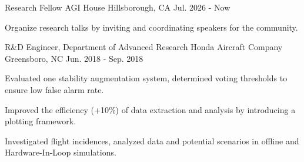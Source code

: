 

\begin{cventries}




  \cventry
    {Research Fellow} %
    {AGI House} %
    {Hillsborough, CA} %
    {Jul. 2026 - Now} %
    {
    \begin{cvitems}
    \item {Organize research talks by inviting and coordinating speakers for the community.}
       \end{cvitems}
    }

  \cventry
    {R\&D Engineer, Department of Advanced Research} %
    {Honda Aircraft Company} %
    {Greensboro, NC} %
    {Jun. 2018 - Sep. 2018} %
    {
      \begin{cvitems} %
        \item {Evaluated one stability augmentation system, determined voting thresholds to ensure low false alarm rate.}
        \item {Improved the efficiency (+10\%) of data extraction and analysis by introducing a plotting framework.}
        \item {Investigated flight incidences, analyzed data and potential scenarios in offline and Hardware-In-Loop simulations.}
      \end{cvitems}
    }


\end{cventries}
